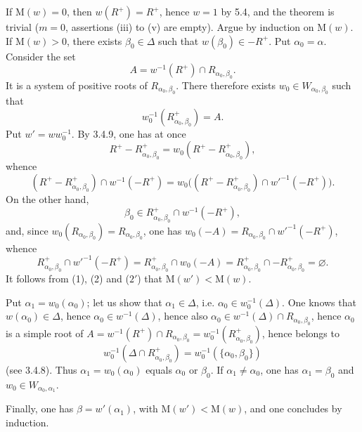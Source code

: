 If $\mathrm M(w)=0$, then $w(R^+)=R^+$, hence $w=1$ by 5.4, and the theorem is trivial ($m=0$, assertions (iii) to (v) are empty). Argue by induction on $\mathrm M(w)$. If $\mathrm M(w)>0$, there exists $\beta_0\in\Delta$ such that $w(\beta_0)\in-R^+$. Put $\alpha_0=\alpha$. Consider the set
\[
A=w^{-1}(R^+)\cap R_{\alpha_0,\beta_0}.
\]
It is a system of positive roots of $R_{\alpha_0,\beta_0}$. There therefore exists $w_0\in W_{\alpha_0,\beta_0}$ such that
\[
w_0^{-1}(R_{\alpha_0,\beta_0}^+)=A.
\]
Put $w'=ww_0^{-1}$. By 3.4.9, one has at once
\[
R^+-R_{\alpha_0,\beta_0}^+=w_0(R^+-R_{\alpha_0,\beta_0}^+),
\]
whence
\begin{equation}\tag{1}\label{XXI.5.6.eq.1}
(R^+-R_{\alpha_0,\beta_0}^+)\cap w^{-1}(-R^+)
=w_0\bigl((R^+-R_{\alpha_0,\beta_0}^+)\cap w'^{-1}(-R^+)\bigr).
\end{equation}
On the other hand,
\begin{equation}\tag{2}\label{XXI.5.6.eq.2}
\beta_0\in R_{\alpha_0,\beta_0}^+\cap w^{-1}(-R^+),
\end{equation}
and, since $w_0(R_{\alpha_0,\beta_0})=R_{\alpha_0,\beta_0}$, one has $w_0(-A)=R_{\alpha_0,\beta_0}\cap w'^{-1}(-R^+)$, whence
\begin{equation}\tag{$2'$}\label{XXI.5.6.eq.2prime}
R_{\alpha_0,\beta_0}^+\cap w'^{-1}(-R^+)=R_{\alpha_0,\beta_0}^+\cap w_0(-A)
=R_{\alpha_0,\beta_0}^+\cap-R_{\alpha_0,\beta_0}^+=\varnothing.
\end{equation}
It follows from (1), (2) and ($2'$) that $\mathrm M(w')<\mathrm M(w)$.

Put $\alpha_1=w_0(\alpha_0)$; let us show that $\alpha_1\in\Delta$, i.e. $\alpha_0\in w_0^{-1}(\Delta)$. One knows that $w(\alpha_0)\in\Delta$, hence $\alpha_0\in w^{-1}(\Delta)$, hence also $\alpha_0\in w^{-1}(\Delta)\cap R_{\alpha_0,\beta_0}$, hence $\alpha_0$ is a simple root of $A=w^{-1}(R^+)\cap R_{\alpha_0,\beta_0}=w_0^{-1}(R_{\alpha_0,\beta_0}^+)$, hence belongs to
\[
w_0^{-1}(\Delta\cap R_{\alpha_0,\beta_0}^+)=w_0^{-1}(\{\alpha_0,\beta_0\})
\]
(see 3.4.8). Thus $\alpha_1=w_0(\alpha_0)$ equals $\alpha_0$ or $\beta_0$. If $\alpha_1\ne\alpha_0$, one has $\alpha_1=\beta_0$ and $w_0\in W_{\alpha_0,\alpha_1}$.

Finally, one has $\beta=w'(\alpha_1)$, with $\mathrm M(w')<\mathrm M(w)$, and one concludes by induction.

